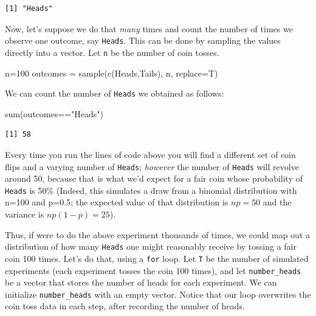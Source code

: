 \documentclass[
  letterpaper,
  DIV=11,
  numbers=noendperiod]{scrreprt}
\newenvironment{Shaded}{\begin{snugshade}}{\end{snugshade}}
\newcommand{\AttributeTok}[1]{\textcolor[rgb]{0.40,0.45,0.13}{#1}}
\newcommand{\DecValTok}[1]{\textcolor[rgb]{0.68,0.00,0.00}{#1}}
\newcommand{\FunctionTok}[1]{\textcolor[rgb]{0.28,0.35,0.67}{#1}}
\newcommand{\NormalTok}[1]{\textcolor[rgb]{0.00,0.23,0.31}{#1}}
\newcommand{\OtherTok}[1]{\textcolor[rgb]{0.00,0.23,0.31}{#1}}
\newcommand{\SpecialCharTok}[1]{\textcolor[rgb]{0.37,0.37,0.37}{#1}}
\newcommand{\StringTok}[1]{\textcolor[rgb]{0.13,0.47,0.30}{#1}}
\begin{document}
\begin{verbatim}
[1] "Heads"
\end{verbatim}

Now, let's suppose we do that \emph{many} times and count the number of
times we observe one outcome, say \texttt{Heads}. This can be done by
sampling the values directly into a vector. Let \texttt{n} be the number
of coin tosses.

\begin{Shaded}
\begin{Highlighting}[]
\NormalTok{n}\OtherTok{=}\DecValTok{100}
\NormalTok{outcomes }\OtherTok{=} \FunctionTok{sample}\NormalTok{(}\FunctionTok{c}\NormalTok{(}\StringTok{\textquotesingle{}Heads\textquotesingle{}}\NormalTok{,}\StringTok{\textquotesingle{}Tails\textquotesingle{}}\NormalTok{), n, }\AttributeTok{replace=}\NormalTok{T)}
\end{Highlighting}
\end{Shaded}

We can count the number of \texttt{Heads} we obtained as follows:

\begin{Shaded}
\begin{Highlighting}[]
\FunctionTok{sum}\NormalTok{(outcomes}\SpecialCharTok{==}\StringTok{"Heads"}\NormalTok{)}
\end{Highlighting}
\end{Shaded}

\begin{verbatim}
[1] 58
\end{verbatim}

Every time you run the lines of code above you will find a different set
of coin flips and a varying number of \texttt{Heads}; \emph{however} the
number of \texttt{Heads} will revolve around 50, because that is what
we'd expect for a fair coin whose probability of \texttt{Heads} is 50\%
(Indeed, this simulates a draw from a binomial distribution with n=100
and p=0.5; the expected value of that distribution is \(np=50\) and the
variance is \(np(1-p)=25\)).

Thus, if were to do the above experiment thousands of times, we could
map out a distribution of how many \texttt{Heads} one might reasonably
receive by tossing a fair coin 100 times. Let's do that, using a
\texttt{for} loop. Let \texttt{T} be the number of simulated experiments
(each experiment tosses the coin 100 times), and let
\texttt{number\_heads} be a vector that stores the number of heads for
each experiment. We can initialize \texttt{number\_heads} with an empty
vector. Notice that our loop overwrites the coin toss data in each step,
after recording the number of heads.
\end{document}
